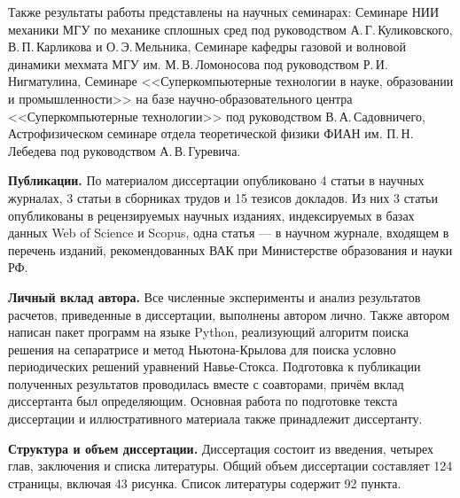 Также результаты работы представлены на научных семинарах: 
Семинаре НИИ механики МГУ по механике сплошных сред под руководством А.\,Г.\,Куликовского, В.\,П.\,Карликова и О.\,Э.\,Мельника, 
Семинаре кафедры газовой и волновой динамики мехмата МГУ им. М.\,В.\,Ломоносова под руководством Р.\,И.\,Нигматулина,
Семинаре <<Суперкомпьютерные технологии в науке, образовании и промышленности>> на базе научно-образовательного центра <<Суперкомпьютерные технологии>> под руководством В.\,А.\,Садовничего,
Астрофизическом семинаре отдела теоретической физики ФИАН им. П.\,Н.\,Лебедева под руководством А.\,В.\,Гуревича.



\textbf{Публикации.} 
По материалом диссертации опубликовано 4 статьи в научных журналах, 3 статьи в сборниках трудов и 15 тезисов докладов. Из них 3 статьи опубликованы в рецензируемых научных изданиях, индексируемых в базах данных Web of Science и Scopus, одна статья --- в научном журнале, входящем в перечень изданий, рекомендованных ВАК при Министерстве образования и науки РФ. 

{\bf Личный вклад автора.} 
Все численные эксперименты и анализ результатов расчетов, приведенные в диссертации, выполнены автором лично. Также автором написан пакет программ на языке Python, реализующий алгоритм поиска решения на сепаратрисе и метод Ньютона-Крылова для поиска условно периодических решений уравнений Навье-Стокса. Подготовка к публикации полученных результатов проводилась вместе с соавторами, причём вклад диссертанта был определяющим. Основная работа по подготовке текста диссертации и иллюстративного материала также принадлежит диссертанту. 

{\bf Структура и объем диссертации.} 
Диссертация состоит из введения, четырех глав, заключения и списка литературы. Общий объем диссертации составляет 124 страницы, включая 43 рисунка. Список литературы содержит 92 пункта. 



